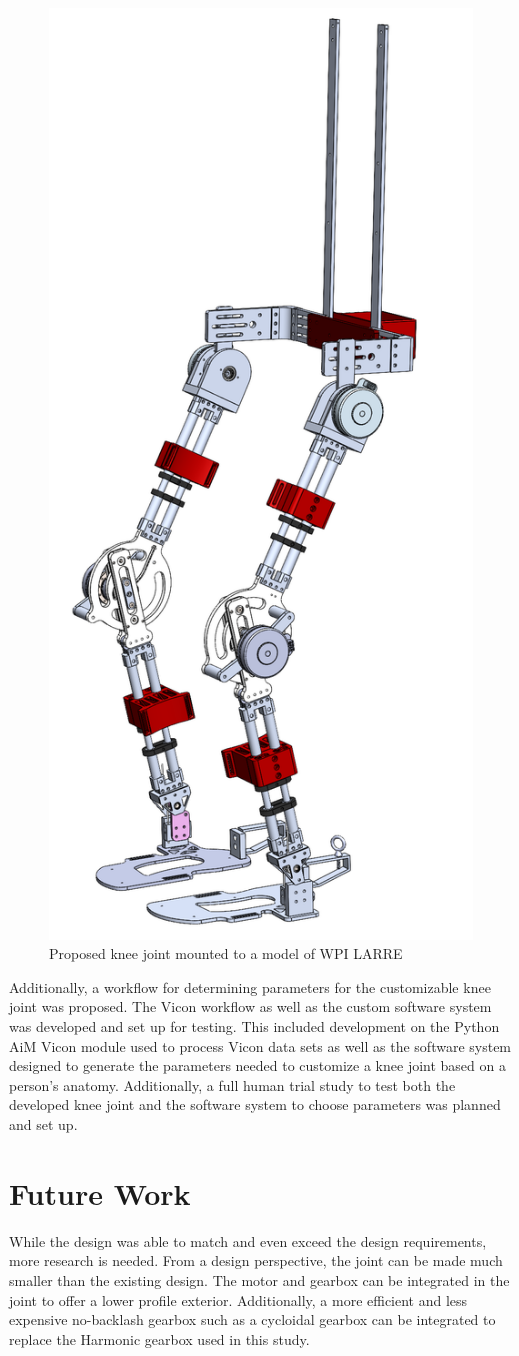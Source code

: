 \begin{figure}[ht!]
    \centering
    \includegraphics[width=0.4\linewidth]{Figures/FinalExoRender.png}
    \caption{Proposed knee joint mounted to a model of WPI LARRE}
    \label{fig:KneeOnExo}
\end{figure}

Additionally, a workflow for determining parameters for the customizable knee joint was proposed. The Vicon workflow as well as the custom software system was developed and set up for testing. This included development on the Python AiM Vicon module used to process Vicon data sets as well as the software system designed to generate the parameters needed to customize a knee joint based on a person's anatomy. Additionally, a full human trial study to test both the developed knee joint and the software system to choose parameters was planned and set up.

\section{Future Work}

While the design was able to match and even exceed the design requirements, more research is needed. From a design perspective, the joint can be made much smaller than the existing design. The motor and gearbox can be integrated in the joint to offer a lower profile exterior. Additionally, a more efficient and less expensive no-backlash gearbox such as a cycloidal gearbox can be integrated to replace the {Harmonic\texttrademark} gearbox used in this study. 

